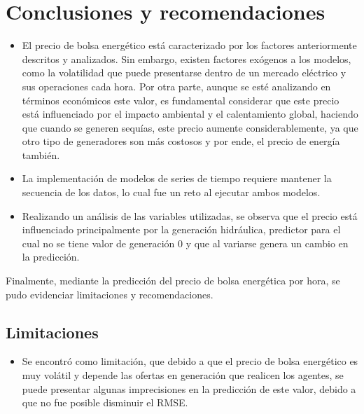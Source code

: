 \documentclass[conference, 10pt]{IEEEtran}
\begin{document}
\section{Conclusiones y recomendaciones}

\begin{itemize}
\item El precio de bolsa energético está caracterizado por los factores anteriormente descritos y analizados. Sin embargo, existen factores exógenos a los modelos, como la volatilidad que puede presentarse dentro de un mercado eléctrico y sus operaciones cada hora. Por otra parte, aunque se esté analizando en términos económicos este valor, es fundamental considerar que este precio está influenciado por el impacto ambiental y el calentamiento global, haciendo que cuando se generen sequías, este precio aumente considerablemente, ya que otro tipo de generadores son más costosos y por ende, el precio de energía también.
\item La implementación de modelos de series de tiempo requiere mantener la secuencia de los datos, lo cual fue un reto al ejecutar ambos modelos.
\item Realizando un análisis de las variables utilizadas, se observa que el precio está influenciado principalmente por la generación hidráulica, predictor para el cual no se tiene valor de generación 0 y que al variarse genera un cambio en la predicción.
 
\end{itemize}

Finalmente, mediante la predicción del precio de bolsa energética por hora, se pudo evidenciar limitaciones y recomendaciones.

\subsection{Limitaciones}
\begin{itemize}
\item Se encontró como limitación, que debido  a que el precio de bolsa energético es muy volátil y depende las ofertas en generación que realicen los agentes, se puede presentar algunas imprecisiones en la predicción de este valor, debido a que no fue posible disminuir el RMSE. 
\end{itemize}
\end{document}
